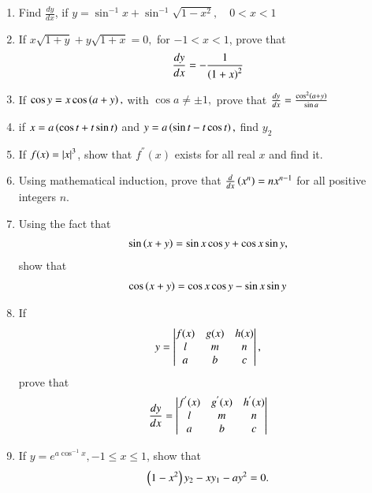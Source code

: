 \begin{enumerate}[label=\arabic*.,ref=\thesubsection.\theenumi]
\item Find $\frac{dy}{dx}$, if 
$
y = \sin ^{-1}x + \sin^{-1}\sqrt{1-x^2}, \quad 0 < x < 1
$
\item If 
$
x\sqrt{1+y}+y\sqrt{1+x} = 0,
$
for $-1<x<1$, prove that
%
\begin{align}
\frac{dy}{dx} = -\frac{1}{\left(1+x\right)^2}
\end{align}
\item If
$
\cos y = x \cos\left(a+y\right), 
$
with 
$
\cos a \ne \pm 1,
$
prove that 
$
\frac{dy}{dx}= \frac{\cos^2\left(a+y\right)}{\sin a}
$
\item if 
$
x = a \left(\cos t + t\sin t\right)
$
and
$
y = a \left(\sin t - t\cos t \right), 
$
find $y_2$
\item If $f(x) =\left\vert x\right\vert^3$, show that $f^{''}(x)$ exists for all real $x$ and find it.
\item Using mathematical induction, prove that $\frac{d}{dx}\left(x^n\right) = nx^{n-1}$ for all positive integers $n$.
\item Using the fact that 
\begin{align}
\sin\left(x+y\right) = \sin x \cos y +\cos x \sin y,
\end{align}
%
show that 
\begin{align}
\cos\left(x+y\right) = \cos x \cos y -\sin x \sin y
\end{align}
\item If 
\begin{align}
y = 
\begin{vmatrix}
f(x) & g(x) & h(x)
\\
l &m & n
\\
a & b & c
\end{vmatrix},
\end{align}
%
prove that 
\begin{align}
\frac{dy}{dx} = 
\begin{vmatrix}
f^{'}(x) & g^{'}(x) & h^{'}(x)
\\
l &m & n
\\
a & b & c
\end{vmatrix}
\end{align}
\item If $y = e^{a\cos^{-1}x}, - 1 \le x \le 1$, show that 
\begin{align}
\left(1-x^2\right)y_2-xy_1-ay^2 = 0.
\end{align}
%

\end{enumerate}
